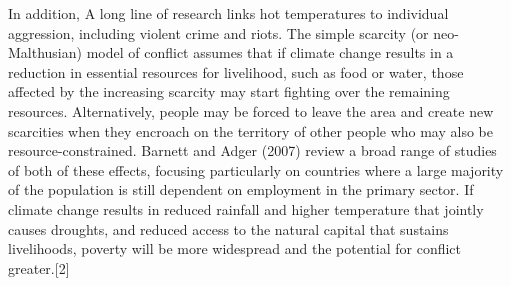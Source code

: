 \documentclass{mcmthesis}
\begin{document}
In addition, A long line of research links hot temperatures to individual aggression, including violent crime and riots. The simple scarcity (or neo-Malthusian) model of conflict assumes that if climate change results in a reduction in essential resources for livelihood, such as food or water, those affected by the increasing scarcity may start fighting over the remaining resources. Alternatively, people may be forced to leave the area and create new scarcities when they encroach on the territory of other people who may also be resource-constrained. Barnett and Adger (2007) review a broad range of studies of both of these effects, focusing particularly on countries where a large majority of the population is still dependent on employment in the primary sector. If climate change results in reduced rainfall and higher temperature that jointly causes droughts, and reduced access to the natural capital that sustains livelihoods, poverty will be more widespread and the potential for conflict greater.[2]
\end{document}
